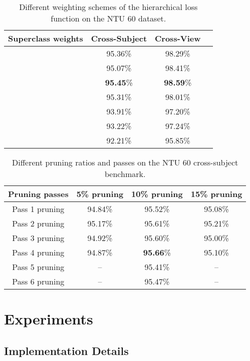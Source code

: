 \documentclass{article}
\begin{document}
\begin{table}[tbh]
\begin{center}
\caption{Different weighting schemes of the hierarchical loss function on the NTU 60 dataset.}
\label{tbl:loss_weigths_comparison}
\begin{tabular}{|c|c|c|c|}
\hline
Superclass weights & Cross-Subject & Cross-View\\ \hline
  & 95.36\% & 98.29\%\\   & 95.07\% & 98.41\% \\   & \textbf{95.45}\% & \textbf{98.59}\% \\   & 95.31\% & 98.01\% \\  & 93.91\%  & 97.20\% \\  & 93.22\%  & 97.24\% \\   & 92.21\% & 95.85\%\\ 

\hline

\end{tabular}
\end{center}
\end{table}

\begin{table}
\begin{center}
\caption{Different pruning ratios and passes on the NTU 60 cross-subject benchmark.}
\label{tbl:pruning_comparison}
\begin{tabular}{|c|c|c|c|}
\hline
Pruning passes & 5\% pruning &  10\% pruning &  15\% pruning \\
\hline
Pass 1 pruning & 94.84\% & 95.52\% & 95.08\% \\
Pass 2 pruning & 95.17\% & 95.61\% & 95.21\% \\
Pass 3 pruning & 94.92\% & 95.60\% & 95.00\% \\
Pass 4 pruning & 94.87\% & \textbf{95.66}\% &95.10\% \\
Pass 5 pruning & -- & 95.41\% & -- \\
Pass 6 pruning & -- & 95.47\% & -- \\
\hline

\end{tabular}
\end{center}
\end{table}
 \section{Experiments}
\label{sec:experiments}

\subsection{Implementation Details}
\end{document}
